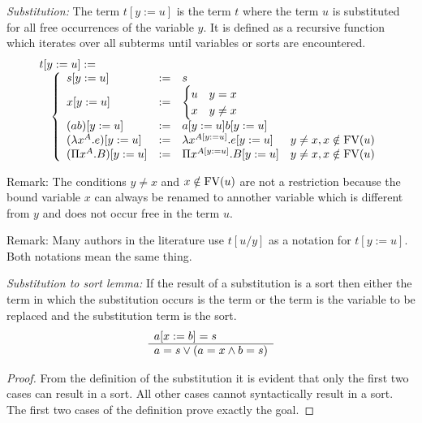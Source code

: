 \begin{definition}
    \emph{Substitution:}
    The term $t[y:=u]$ is the term $t$ where the term $u$ is substituted for all
    free occurrences of the variable $y$. It is defined as a recursive function
    which iterates over all subterms until variables or sorts are encountered.
    $$
    \begin{array}{l}
        t[y:=u] :=
        \\
        \quad\left\{ \begin{array}{llll} 
            s[y:=u] &:=& s
            \\
            x[y:=u] &:=&
                \begin{cases}
                    u & y = x
                    \\
                    x & y \ne x
                \end{cases}
            \\
            (a b)[y:=u] &:=& a[y:=u] b[y:=u]
            \\
            (\lambda x^A . e)[y:=u]
            &:=&
            \lambda x^{A[y:=u]}.e[y:=u]
            & y \ne x, x \notin \text{FV}(u)
            \\
            (\Pi x^A . B)[y:=u]
            &:=&
            \Pi x^{A[y:=u]}. B[y:=u]
            & y \ne x, x \notin \text{FV}(u)
         \end{array} \right.
    \end{array}
    $$
\end{definition}

Remark:
        The conditions $y \ne x$ and $x \notin \text{FV}(u)$ are not a restriction
        because the bound variable $x$ can always be renamed to annother
        variable which is different from $y$ and does not occur free in the term
        $u$.

Remark:
        Many authors in the literature use $t[u/y]$ as a notation for $t[y:=u]$.
        Both notations mean the same thing.


\begin{lemma}
    \label{SubstitutionToSort}
    \emph{Substitution to sort lemma:}
    If the result of a substitution is a sort then either the term in
    which the substitution occurs is the term or the term is the variable to be
    replaced and the substitution term is the sort.
    $$
        \begin{array}{l} 
            a[x:=b] = s
         \\ \hline 
            a = s \lor (a = x \land b = s)
        \end{array}
    $$
    \begin{proof}
        From the definition of the substitution it is evident that only the
        first two cases can result in a sort. All other cases cannot
        syntactically result in a sort. The first two cases of the definition
        prove exactly the goal.
    \end{proof}
\end{lemma}


